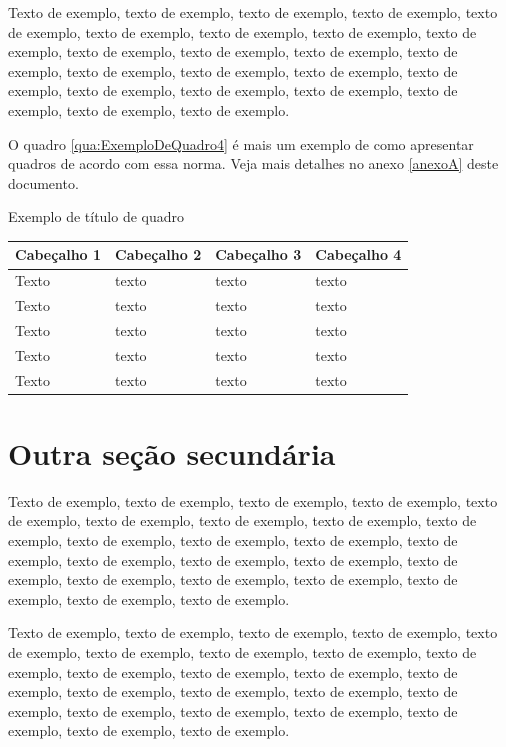 \documentclass[
	12pt,				%
	oneside,			%
	a4paper,			%
	english,			%
	brazil				%
	]{abntex2ppgsi}
\begin{document}
Texto de exemplo, texto de exemplo, texto de exemplo, texto de exemplo, texto de exemplo, texto de exemplo, texto de exemplo, texto de exemplo, texto de exemplo, texto de exemplo, texto de exemplo, texto de exemplo, texto de exemplo, texto de exemplo, texto de exemplo, texto de exemplo, texto de exemplo, texto de exemplo, texto de exemplo, texto de exemplo, texto de exemplo, texto de exemplo, texto de exemplo.

O quadro \ref{qua:ExemploDeQuadro4} é mais um exemplo de como apresentar quadros de acordo com essa norma. Veja mais detalhes no anexo \ref{anexoA} deste documento.

\begin{quadro}[H]
	\centering
	\caption{Exemplo de título de quadro}
	\begin{tabular}{|p{1in} | p{1in} | p{1in} | p{1in} |} \hline
		
		Cabeçalho 1	& Cabeçalho 2	& Cabeçalho 3	& Cabeçalho 4 \\ \hline
		Texto	& texto & texto	& texto \\ \hline
		Texto	& texto & texto	& texto \\ \hline
		Texto	& texto & texto	& texto \\ \hline
		Texto	& texto & texto	& texto \\ \hline
		Texto	& texto & texto	& texto \\ \hline
		
	\end{tabular}
	\label{qua:ExemploDeQuadro4}
\end{quadro}

\section{Outra seção secundária}

Texto de exemplo, texto de exemplo, texto de exemplo, texto de exemplo, texto de exemplo, texto de exemplo, texto de exemplo, texto de exemplo, texto de exemplo, texto de exemplo, texto de exemplo, texto de exemplo, texto de exemplo, texto de exemplo, texto de exemplo, texto de exemplo, texto de exemplo, texto de exemplo, texto de exemplo, texto de exemplo, texto de exemplo, texto de exemplo, texto de exemplo.

Texto de exemplo, texto de exemplo, texto de exemplo, texto de exemplo, texto de exemplo, texto de exemplo, texto de exemplo, texto de exemplo, texto de exemplo, texto de exemplo, texto de exemplo, texto de exemplo, texto de exemplo, texto de exemplo, texto de exemplo, texto de exemplo, texto de exemplo, texto de exemplo, texto de exemplo, texto de exemplo, texto de exemplo, texto de exemplo, texto de exemplo.
\end{document}
